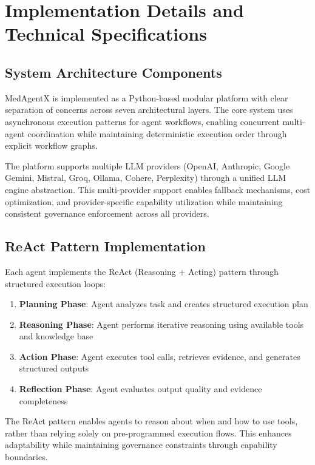 \documentclass[conference]{IEEEtran}
\begin{document}
\section{Implementation Details and Technical Specifications}

\subsection{System Architecture Components}
MedAgentX is implemented as a Python-based modular platform with clear separation of concerns across seven architectural layers. The core system uses asynchronous execution patterns for agent workflows, enabling concurrent multi-agent coordination while maintaining deterministic execution order through explicit workflow graphs.

The platform supports multiple LLM providers (OpenAI, Anthropic, Google Gemini, Mistral, Groq, Ollama, Cohere, Perplexity) through a unified LLM engine abstraction. This multi-provider support enables fallback mechanisms, cost optimization, and provider-specific capability utilization while maintaining consistent governance enforcement across all providers.

\subsection{ReAct Pattern Implementation}
Each agent implements the ReAct (Reasoning + Acting) pattern through structured execution loops:

\begin{enumerate}
    \item \textbf{Planning Phase}: Agent analyzes task and creates structured execution plan
    \item \textbf{Reasoning Phase}: Agent performs iterative reasoning using available tools and knowledge base
    \item \textbf{Action Phase}: Agent executes tool calls, retrieves evidence, and generates structured outputs
    \item \textbf{Reflection Phase}: Agent evaluates output quality and evidence completeness
\end{enumerate}

The ReAct pattern enables agents to reason about when and how to use tools, rather than relying solely on pre-programmed execution flows. This enhances adaptability while maintaining governance constraints through capability boundaries.
\end{document}
